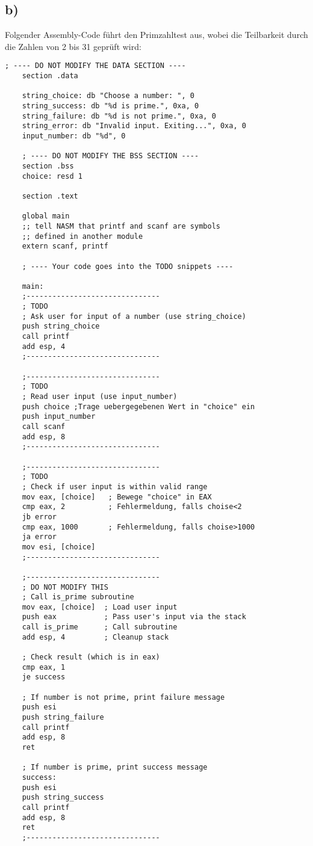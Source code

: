 \documentclass[]{scrreprt}
\begin{document}
	\subsection*{b)}
	Folgender Assembly-Code führt den Primzahltest aus, wobei die Teilbarkeit durch die Zahlen von 2 bis 31 geprüft wird:
	\begin{lstlisting}[caption={Assembler Code "Primzahltest"},captionpos=b]
	; ---- DO NOT MODIFY THE DATA SECTION ----
	section .data
	
	string_choice: db "Choose a number: ", 0
	string_success: db "%d is prime.", 0xa, 0
	string_failure: db "%d is not prime.", 0xa, 0
	string_error: db "Invalid input. Exiting...", 0xa, 0
	input_number: db "%d", 0
	
	; ---- DO NOT MODIFY THE BSS SECTION ----
	section .bss
	choice: resd 1
	
	section .text
	
	global main
	;; tell NASM that printf and scanf are symbols
	;; defined in another module
	extern scanf, printf
	
	; ---- Your code goes into the TODO snippets ----
	
	main:
	;-------------------------------
	; TODO
	; Ask user for input of a number (use string_choice)
	push string_choice
	call printf
	add esp, 4
	;-------------------------------
	
	;-------------------------------
	; TODO
	; Read user input (use input_number)
	push choice ;Trage uebergegebenen Wert in "choice" ein
	push input_number
	call scanf
	add esp, 8
	;-------------------------------
	
	;-------------------------------
	; TODO
	; Check if user input is within valid range
	mov eax, [choice]	; Bewege "choice" in EAX
	cmp eax, 2			; Fehlermeldung, falls choise<2
	jb error
	cmp eax, 1000		; Fehlermeldung, falls choise>1000
	ja error
	mov esi, [choice]
	;-------------------------------
	
	;-------------------------------
	; DO NOT MODIFY THIS
	; Call is_prime subroutine
	mov eax, [choice]  ; Load user input
	push eax           ; Pass user's input via the stack
	call is_prime      ; Call subroutine
	add esp, 4         ; Cleanup stack
	
	; Check result (which is in eax)
	cmp eax, 1
	je success
	
	; If number is not prime, print failure message
	push esi
	push string_failure
	call printf
	add esp, 8
	ret 
	
	; If number is prime, print success message
	success:
	push esi
	push string_success
	call printf
	add esp, 8
	ret
	;-------------------------------
	

\end{lstlisting}
\end{document}
